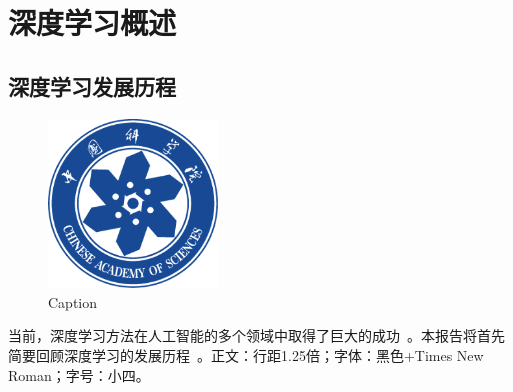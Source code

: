 \documentclass[a4paper, AutoFakeBold]{article}
\title{\mytitle}
\author{xxx}
\date{\today}
\begin{document}
\maketitle

\setcounter{page}{1}
\begin{abstract}
这是一段摘要，用来占位。这是一段摘要，用来占位。这是一段摘要，用来占位。这是一段摘要，用来占位。这是一段摘要，用来占位。这是一段摘要，用来占位。这是一段摘要，用来占位。这是一段摘要，用来占位。这是一段摘要，用来占位。这是一段摘要，用来占位。这是一段摘要，用来占位。这是一段摘要，用来占位。这是一段摘要，用来占位。这是一段摘要，用来占位。这是一段摘要，用来占位。这是一段摘要，用来占位。这是一段摘要，用来占位。这是一段摘要，用来占位。这是一段摘要，用来占位。这是一段摘要，用来占位。这是一段摘要，用来占位。这是一段摘要，用来占位。这是一段摘要，用来占位。这是一段摘要，用来占位。这是一段摘要，用来占位。这是一段摘要，用来占位。这是一段摘要，用来占位。这是一段摘要，用来占位。这是一段摘要，用来占位。这是一段摘要，用来占位。这是一段摘要，用来占位。这是一段摘要，用来占位。这是一段摘要，用来占位。这是一段摘要，用来占位。这是一段摘要，用来占位。这是一段摘要，用来占位。这是一段摘要，用来占位。这是一段摘要，用来占位。这是一段摘要，用来占位。这是一段摘要，用来占位。这是一段摘要，用来占位。这是一段摘要，用来占位。这是一段摘要，用来占位。这是一段摘要，用来占位。这是一段摘要，用来占位。这是一段摘要，用来占位。这是一段摘要，用来占位。这是一段摘要，用来占位。这是一段摘要，用来占位。这是一段摘要，用来占位。这是一段摘要，用来占位。这是一段摘要，用来占位。这是一段摘要，用来占位。这是一段摘要，用来占位。
\end{abstract}
\section{深度学习概述}
\subsection{深度学习发展历程}
\begin{figure}
    \centering
    \includegraphics[width=0.4\textwidth]{figures/UCAS.png}
    \caption{Caption}
    \label{fig:enter-label}
\end{figure}
当前，深度学习方法在人工智能的多个领域中取得了巨大的成功~\cite{defferrard2016convolutional}。本报告将首先简要回顾深度学习的发展历程~\cite{hechtlinger2017generalization}。正文：行距1.25倍；字体：黑色+Times New Roman；字号：小四。
\end{document}
